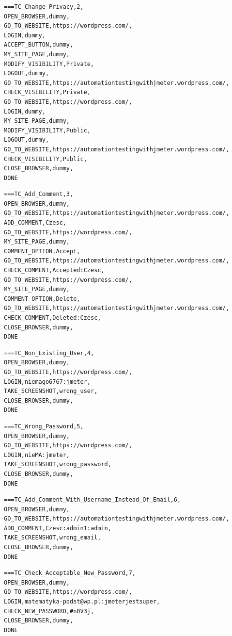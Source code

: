 \begin{lstlisting}
===TC_Change_Privacy,2,
OPEN_BROWSER,dummy,
GO_TO_WEBSITE,https://wordpress.com/,
LOGIN,dummy,
ACCEPT_BUTTON,dummy,
MY_SITE_PAGE,dummy,
MODIFY_VISIBILITY,Private,
LOGOUT,dummy,
GO_TO_WEBSITE,https://automationtestingwithjmeter.wordpress.com/,
CHECK_VISIBILITY,Private,
GO_TO_WEBSITE,https://wordpress.com/,
LOGIN,dummy,
MY_SITE_PAGE,dummy,
MODIFY_VISIBILITY,Public,
LOGOUT,dummy,
GO_TO_WEBSITE,https://automationtestingwithjmeter.wordpress.com/,
CHECK_VISIBILITY,Public,
CLOSE_BROWSER,dummy,
DONE
\end{lstlisting}

\begin{lstlisting}
===TC_Add_Comment,3,
OPEN_BROWSER,dummy,
GO_TO_WEBSITE,https://automationtestingwithjmeter.wordpress.com/,
ADD_COMMENT,Czesc,
GO_TO_WEBSITE,https://wordpress.com/,
MY_SITE_PAGE,dummy,
COMMENT_OPTION,Accept,
GO_TO_WEBSITE,https://automationtestingwithjmeter.wordpress.com/,
CHECK_COMMENT,Accepted:Czesc,
GO_TO_WEBSITE,https://wordpress.com/,
MY_SITE_PAGE,dummy,
COMMENT_OPTION,Delete,
GO_TO_WEBSITE,https://automationtestingwithjmeter.wordpress.com/,
CHECK_COMMENT,Deleted:Czesc,
CLOSE_BROWSER,dummy,
DONE
\end{lstlisting}

\begin{lstlisting}
===TC_Non_Existing_User,4,
OPEN_BROWSER,dummy,
GO_TO_WEBSITE,https://wordpress.com/,
LOGIN,niemago6767:jmeter,
TAKE_SCREENSHOT,wrong_user,
CLOSE_BROWSER,dummy,
DONE
\end{lstlisting}

\begin{lstlisting}
===TC_Wrong_Password,5,
OPEN_BROWSER,dummy,
GO_TO_WEBSITE,https://wordpress.com/,
LOGIN,nieMA:jmeter,
TAKE_SCREENSHOT,wrong_password,
CLOSE_BROWSER,dummy,
DONE
\end{lstlisting}

\begin{lstlisting}
===TC_Add_Comment_With_Username_Instead_Of_Email,6,
OPEN_BROWSER,dummy,
GO_TO_WEBSITE,https://automationtestingwithjmeter.wordpress.com/,
ADD_COMMENT,Czesc:admin1:admin,
TAKE_SCREENSHOT,wrong_email,
CLOSE_BROWSER,dummy,
DONE
\end{lstlisting}

\begin{lstlisting}
===TC_Check_Acceptable_New_Password,7,
OPEN_BROWSER,dummy,
GO_TO_WEBSITE,https://wordpress.com/,
LOGIN,matematyka-podst@wp.pl:jmeterjestsuper,
CHECK_NEW_PASSWORD,#n0V3j,
CLOSE_BROWSER,dummy,
DONE
\end{lstlisting}

